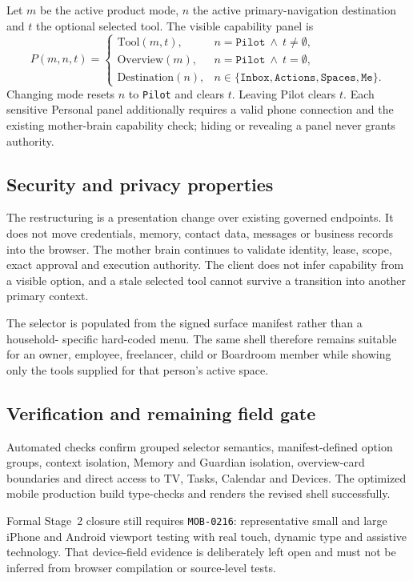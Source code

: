 Let $m$ be the active product mode, $n$ the active primary-navigation destination and
$t$ the optional selected tool.  The visible capability panel is
\[
  P(m,n,t)=
  \left\{\begin{array}{ll}
    \mathrm{Tool}(m,t), & n=\texttt{Pilot}\ \land\ t\neq\emptyset,\\
    \mathrm{Overview}(m), & n=\texttt{Pilot}\ \land\ t=\emptyset,\\
    \mathrm{Destination}(n), & n\in\{\texttt{Inbox},\texttt{Actions},
      \texttt{Spaces},\texttt{Me}\}.
  \end{array}\right.
\]
Changing mode resets $n$ to \texttt{Pilot} and clears $t$.  Leaving Pilot clears $t$.
Each sensitive Personal panel additionally requires a valid phone connection and the
existing mother-brain capability check; hiding or revealing a panel never grants
authority.

\subsection{Security and privacy properties}

The restructuring is a presentation change over existing governed endpoints.  It
does not move credentials, memory, contact data, messages or business records into
the browser.  The mother brain continues to validate identity, lease, scope, exact
approval and execution authority.  The client does not infer capability from a
visible option, and a stale selected tool cannot survive a transition into another
primary context.

The selector is populated from the signed surface manifest rather than a household-
specific hard-coded menu.  The same shell therefore remains suitable for an owner,
employee, freelancer, child or Boardroom member while showing only the tools supplied
for that person's active space.

\subsection{Verification and remaining field gate}

Automated checks confirm grouped selector semantics, manifest-defined option groups,
context isolation, Memory and Guardian isolation, overview-card boundaries and direct
access to TV, Tasks, Calendar and Devices.  The optimized mobile production build
type-checks and renders the revised shell successfully.

Formal Stage~2 closure still requires \texttt{MOB-0216}: representative small and
large iPhone and Android viewport testing with real touch, dynamic type and assistive
technology.  That device-field evidence is deliberately left open and must not be
inferred from browser compilation or source-level tests.
